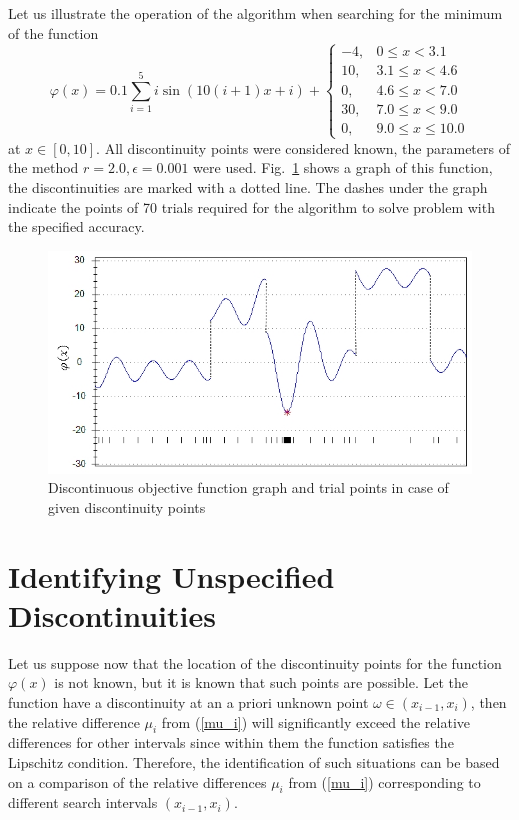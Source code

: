 \documentclass[runningheads]{llncs}
\begin{document}
Let us illustrate the operation of the algorithm when searching for the minimum of the function
\begin{equation}\label{testFunction}
\varphi(x) =  0.1\sum_{i=1}^5{i\sin{(10(i+1)x+i)}}+
\begin{cases}
	-4, &0 \leq x < 3.1\\
	10, &3.1 \leq x < 4.6\\
	0, &4.6 \leq x < 7.0\\
	30, &7.0 \leq x < 9.0\\
	0, &9.0 \leq x \leq 10.0
\end{cases}
\end{equation}
at $x\in[0,10]$. All discontinuity points were considered known, the parameters of the method $r=2.0,\epsilon=0.001$ were used. Fig.~\ref{ris1} shows a graph of this function, the discontinuities are marked with a dotted line. The dashes under the graph indicate the points of 70 trials required for the algorithm to solve problem with the specified accuracy.

\begin{figure}[ht]
	\begin{center}
			\includegraphics[width=0.9\linewidth]{ris_1.jpg}
			\caption{Discontinuous objective function graph and trial points in case of given discontinuity points}
      \label{ris1}
	\end{center}
\end{figure}

\section{Identifying Unspecified Discontinuities}

Let us suppose now that the location of the discontinuity points for the function $\varphi(x)$ is not known, but it is known that such points are possible. Let the function have a discontinuity at an a priori unknown point $\omega \in(x_{i-1},x_i)$, then the relative difference $\mu_i$ from (\ref{mu_i}) will significantly exceed the relative differences for other intervals since within them the function satisfies the Lipschitz condition. Therefore, the identification of such situations can be based on a comparison of the relative differences $\mu_i$ from (\ref{mu_i}) corresponding to different search intervals $(x_{i-1},x_i)$.
\end{document}
